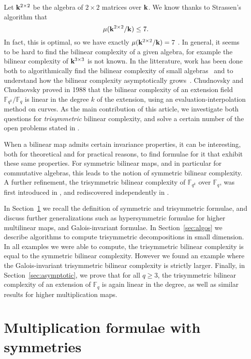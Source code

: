 \documentclass[11pt]{article}
\begin{document}
Let $\mathbf{k}^{2\times2}$ be the algebra
of $2\times2$ matrices over $\mathbf{k}$. We know thanks to Strassen's algorithm that 
\[
  \mu(\mathbf{k}^{2\times 2}/\mathbf{k}) \leq 7.
\]
In fact, this is optimal, so we have exactly $\mu(\mathbf{k}^{2\times2}/\mathbf{k})=7$ \cite[Thm.~3.1]{Winograd71}. In
general, it seems to be hard to find the bilinear complexity of a given algebra,
for example the bilinear complexity of $\mathbf{k}^{3\times3}$ is not known.
In the litterature, work has been done both to algorithmically find the bilinear complexity of
small algebras~\cite{BDEZ12, Covanov19} and to understand how the bilinear
complexity asymptotically grows~\cite{CC88, BCPRRR19}. Chudnovsky and Chudnovsky
proved in 1988 that the bilinear complexity of an extension field
$\mathbb{F}_{q^k}/\mathbb{F}_{q}$ is linear in the degree $k$ of the
extension, using an evaluation-interpolation method on curves.
As the main contribution of this article, we
investigate both questions for \emph{trisymmetric} bilinear complexity,
and solve a certain number of the open problems stated in \cite[\S5.2]{BCPRRR19}.

When a bilinear map admits certain invariance properties, it can be interesting,
both for theoretical and for practical reasons,
to find formulae for it that exhibit these same properties.
For symmetric bilinear maps, and in particular for commutative algebras, this leads to the notion of symmetric bilinear complexity.
A further refinement, the trisymmetric bilinear complexity of $\mathbb{F}_{q^k}$ over $\mathbb{F}_{q}$, was first introduced in \cite{SL84}, and rediscovered independently in \cite[App.~A]{Randriam15}.

In Section~\ref{sec:symtrisym} we recall the definition of symmetric and trisymmetric formulae, and discuss further generalizations such as hypersymmetric formulae for higher multilinear maps,
and Galois-invariant formulae. In Section~\ref{sec:algos} we
describe algorithms to compute trisymmetric decompositions in small dimension.
In all examples we were able to compute, the trisymmetric bilinear complexity is equal to the symmetric bilinear
complexity. However we found an example where the Galois-invariant trisymmetric bilinear complexity is strictly larger.
Finally, in
Section~\ref{sec:asymptotic}, we prove that for all $q\geq3$, the trisymmetric bilinear
complexity of an extension of $\mathbb{F}_q$ is again linear in the degree, as well as similar results
for higher multiplication maps.

\section{Multiplication formulae with symmetries}
\label{sec:symtrisym}
\end{document}
